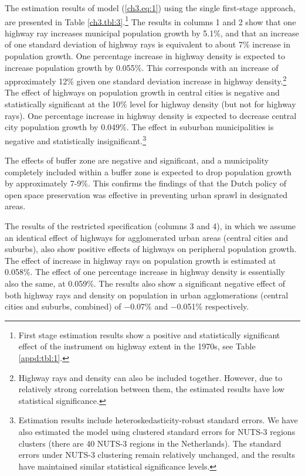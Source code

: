 \documentclass[a4paper,authoryear,review]{elsarticle}  	%
\begin{document}
	The estimation results of model (\ref{ch3.eq:1}) using the single first-stage approach, are presented in Table \ref{ch3.tbl:3}.\footnote{First stage estimation results show a positive and statistically significant effect of the instrument on highway extent in the 1970s, see Table \ref{appd:tbl:1}.} 
	The results in columns 1 and 2 show that one highway ray increases municipal population growth by 5.1\%, and that an increase of one standard deviation of highway rays is equivalent to about 7\% increase in population growth. One percentage increase in highway density is expected to increase population growth by 0.055\%. This corresponds with an increase of approximately 12\% given one standard deviation increase in highway density.\footnote{Highway rays and density can also be included together. However, due to relatively strong correlation between them, the estimated results have low statistical significance.} 
	The effect of highways on population growth in central cities is negative and statistically significant at the 10\% level for highway density (but not for highway rays). One percentage increase in highway density is expected to decrease central city population growth by 0.049\%. The effect in suburban municipalities is negative and statistically insignificant.\footnote{Estimation results include heteroskedasticity-robust standard errors. We have also estimated the model using clustered standard errors for NUTS-3 regions clusters (there are 40 NUTS-3 regions in the Netherlands). The standard errors under NUTS-3 clustering remain relatively unchanged, and the results have maintained similar statistical significance levels.}
	
	The effects of buffer zone are negative and significant, and a municipality completely included within a buffer zone is expected to drop population growth by approximately 7-9\%. 
	This confirms the findings of \citet{Geurs2006a,Koomen2008,Koomen2013} that the Dutch policy of open space preservation was effective in preventing urban sprawl in designated areas.
	
	
	The results of the restricted specification (columns 3 and 4), in which we assume an identical effect of highways for agglomerated urban areas (central cities and suburbs), also show positive effects of highways on peripheral population growth. The effect of increase in highway rays on population growth is estimated at 0.058\%. The effect of one percentage increase in highway density is essentially also the same, at 0.059\%. The results also show a significant negative effect of both highway rays and density on population in urban agglomerations (central cities and suburbs, combined) of  $-$0.07\% and $-$0.051\% respectively. 
	
\end{document}
